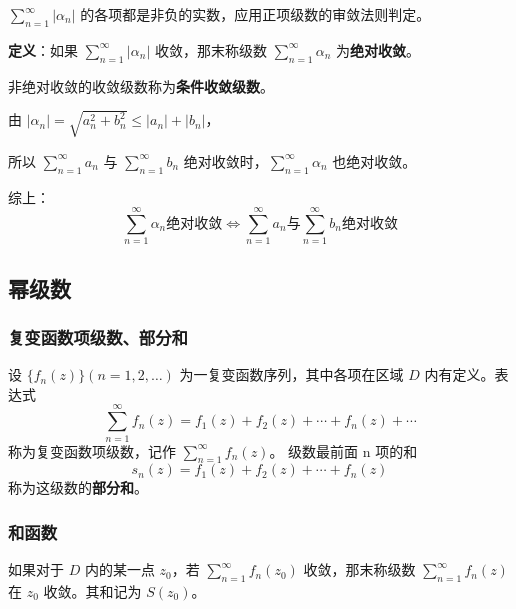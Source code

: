 \begin{tcolorbox}[title={注意},colback=red!5!white
,colframe=red!75!black
,colbacktitle=yellow!50!red
,coltitle=red!25!black, fonttitle=\bfseries,subtitle style={boxrule=0.4pt, colback=yellow!50!red!25!white}]
\(\sum\limits_{n=1}^{\infty} \left| \alpha_n \right|\)
的各项都是非负的实数，应用正项级数的审敛法则判定。

\end{tcolorbox}

\textbf{定义}：如果 \(\sum\limits_{n=1}^{\infty}|\alpha_{n}|\) 收敛，那末称级数
\(\sum\limits_{n=1}^{\infty}\alpha_{n}\) 为\textbf{绝对收敛}。

非绝对收敛的收敛级数称为\textbf{条件收敛级数}。

\begin{tcolorbox}[title={说明},colback=red!5!white
,colframe=red!75!black
,colbacktitle=yellow!50!red
,coltitle=red!25!black, fonttitle=\bfseries,subtitle style={boxrule=0.4pt, colback=yellow!50!red!25!white}]
由 \(|\alpha_{n}|=\sqrt{a_{n}^{2}+b_{n}^{2}}\leq|a_{n}|+|b_{n}|\)，

所以 \(\sum\limits_{n=1}^{\infty}a_{n}\) 与
\(\sum\limits_{n=1}^{\infty}b_{n}\)
绝对收敛时，\(\sum\limits_{n=1}^{\infty}\alpha_{n}\) 也绝对收敛。

综上： \[
\boxed{\sum\limits_{n=1}^{\infty}\alpha_{n} \text{绝对收敛} \Leftrightarrow\sum\limits_{n=1}^{\infty}a_{n} \text{与} \sum\limits_{n=1}^{\infty}b_{n} \text{绝对收敛}}
\]

\end{tcolorbox}
\subsection{幂级数}
\label{幂级数}
\subsubsection{复变函数项级数、部分和}
\label{复变函数项级数部分和}
设 \(\{f_n(z)\}(n=1,2,\ldots)\) 为一复变函数序列，其中各项在区域 \(D\)
内有定义。表达式
\[
\sum_{n=1}^{\infty} f_n(z) = f_1(z) + f_2(z) + \cdots + f_n(z) + \cdots
\]
称为复变函数项级数，记作 \(\sum_{n=1}^{\infty}f_{n}(z)\)。
级数最前面 n 项的和
\[
s_{n}(z)=f_{1}(z)+f_{2}(z)+\cdots +f_{n}(z)
\]
称为这级数的\textbf{部分和}。
\subsubsection{和函数}
\label{和函数}
如果对于 \(D\) 内的某一点 \(z_0\)，若
\(\sum\limits_{n=1}^{\infty} f_n(z_0)\) 收敛，那末称级数
\(\sum\limits_{n=1}^{\infty} f_n(z)\) 在 \(z_0\) 收敛。其和记为
\(S(z_0)\)。

